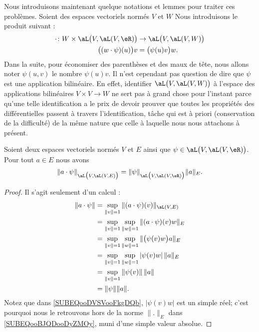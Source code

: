 Nous introduisons maintenant quelque notations et lemmes pour traiter ces problèmes. Soient des espaces vectoriels normés \( V\) et \( W\) Nous introduisons le produit suivant\cite{MonCerveau} :
\begin{equation}
    \begin{aligned}
        \cdot\colon W\times \aL\big( V,\aL(V,\eR) \big)   &\to \aL\big( V,\aL(V,W) \big) \\
        \big( (w\cdot \psi)(u) \big)v&=\big( \psi(u)v \big)w. 
    \end{aligned}
\end{equation}
Dans la suite, pour économiser des parenthèses et des maux de tête, nous allons noter \( \psi(u,v)\) le nombre \( \psi(u)v\). Il n'est cependant pas question de dire que \( \psi\) est une application bilinéaire. En effet, identifier \( \aL\big( V,\aL(V,W) \big)\) à l'espace des applications bilinéaires \( V\times V\to W\) ne sert pas à grand chose pour l'instant parce qu'une telle identification a le prix de devoir prouver que toutes les propriétés des différentielles passent à travers l'identification, tâche qui est à priori (conservation de la difficulté) de la même nature que celle à laquelle nous nous attachons à présent.

\begin{lemma}        \label{LEMooHCUSooXYHuBR}
    Soient deux espaces vectoriels normés \( V\) et \( E\) ainsi que \( \psi\in\aL\big( V,\aL(V,\eR) \big)\). Pour tout \( a\in E\) nous avons
    \begin{equation}
        \| a\cdot \psi \|_{\aL\big( V,\aL(V,E) \big)}= \| \psi \|_{\aL\big( V,\aL(V,\eR) \big)}\| a \|_E.
    \end{equation}
\end{lemma}

\begin{proof}
    Il s'agit seulement d'un calcul :
    \begin{subequations}
        \begin{align}
            \| a\cdot \psi \|&=\sup_{\| v \|=1}\| (a\cdot \psi)(v) \|_{\aL(V,E)}\\
            &=\sup_{\| v \|=1}\sup_{\| w \|=1}\| (a\cdot\psi)(v)w \|_E\\
            &=\sup_{\| v \|=1}\sup_{\| w \|=1}\| \big( \psi(v)w \big)a \|_E  \label{SUBEQooDVSVooFkgDQb}   \\
            &=\sup_{\| v \|=1}\sup_{\| w \|=1}| \psi(v)w |\,\| a \|_{E} \label{SUBEQooBJQDooDyZMOy}   \\
            &=\sup_{\| v \|=1}\| \psi(v) \|\,\| a \|\\
            &=\| \psi \|\| a \|.
        \end{align}
    \end{subequations}
    Notez que dans \eqref{SUBEQooDVSVooFkgDQb}, \( | \psi(v)w |\) est un simple réel; c'est pourquoi nous le retrouvons hors de la norme \( \| . \|_E\) dans \eqref{SUBEQooBJQDooDyZMOy}, muni d'une simple valeur absolue.
\end{proof}

